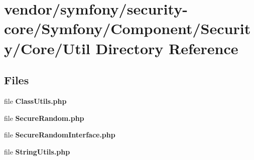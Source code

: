 \section{vendor/symfony/security-\/core/\+Symfony/\+Component/\+Security/\+Core/\+Util Directory Reference}
\label{dir_167988f1296ab3946dd99056717d9cf4}
\subsection*{Files}
\begin{DoxyCompactItemize}
\item 
file {\bf Class\+Utils.\+php}
\item 
file {\bf Secure\+Random.\+php}
\item 
file {\bf Secure\+Random\+Interface.\+php}
\item 
file {\bf String\+Utils.\+php}
\end{DoxyCompactItemize}
